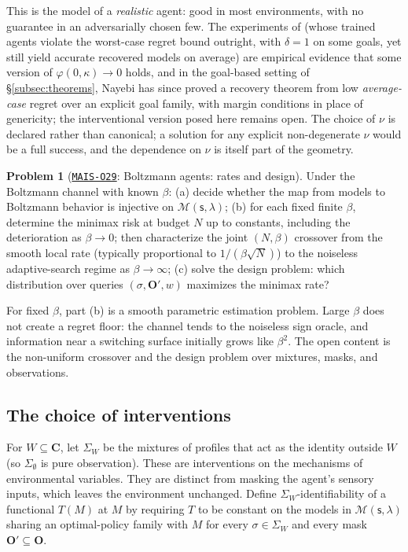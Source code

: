 \documentclass[11pt]{amsart}
\newcommand{\Oid}[1]{\href{https://github.com/lionellevine/MAIS/blob/main/open-problems/MAIS-O#1.md}{\texttt{MAIS-O#1}}}
\theoremstyle{plain}
\theoremstyle{definition}
\newtheorem{problem}[theorem]{Problem}
\newcommand{\bC}{\mathbf{C}}
\newcommand{\bO}{\mathbf{O}}
\newcommand{\MM}{\mathcal{M}}
\newcommand{\sk}{\mathsf{s}}
\begin{document}
This is the model of a \emph{realistic} agent: good in most environments, with no guarantee in an adversarially chosen few. The experiments of \cite{richens2025} (whose trained agents violate the worst-case regret bound outright, with $\delta=1$ on some goals, yet still yield accurate recovered models on average) are empirical evidence that some version of $\varphi(0,\kappa)\to0$ holds, and in the goal-based setting of \S\ref{subsec:theorems}, Nayebi \cite{nayebi2026} has since proved a recovery theorem from low \emph{average-case} regret over an explicit goal family, with margin conditions in place of genericity; the interventional version posed here remains open. The choice of $\nu$ is declared rather than canonical; a solution for any explicit non-degenerate $\nu$ would be a full success, and the dependence on $\nu$ is itself part of the geometry.

\begin{problem}[\Oid{29}: Boltzmann agents: rates and design]\label{prob:boltzmann}
Under the Boltzmann channel with known $\beta$: (a) decide whether the map from models to Boltzmann behavior is injective on $\MM(\sk,\lambda)$; (b) for each fixed finite $\beta$, determine the minimax risk at budget $N$ up to constants, including the deterioration as $\beta\to0$; then characterize the joint $(N,\beta)$ crossover from the smooth local rate (typically proportional to $1/(\beta\sqrt N)$) to the noiseless adaptive-search regime as $\beta\to\infty$; (c) solve the design problem: which distribution over queries $(\sigma,\bO',w)$ maximizes the minimax rate?
\end{problem}

For fixed $\beta$, part (b) is a smooth parametric estimation problem. Large $\beta$ does not create a regret floor: the channel tends to the noiseless sign oracle, and information near a switching surface initially grows like $\beta^2$. The open content is the non-uniform crossover and the design problem over mixtures, masks, and observations.

\subsection{The choice of interventions}

For $W\subseteq\bC$, let $\Sigma_W$ be the mixtures of profiles that act as the identity outside $W$ (so $\Sigma_\emptyset$ is pure observation). These are interventions on the mechanisms of environmental variables. They are distinct from masking the agent's sensory inputs, which leaves the environment unchanged. Define $\Sigma_W$-identifiability of a functional $T(M)$ at $M$ by requiring $T$ to be constant on the models in $\MM(\sk,\lambda)$ sharing an optimal-policy family with $M$ for every $\sigma\in\Sigma_W$ and every mask $\bO'\subseteq\bO$.
\end{document}
